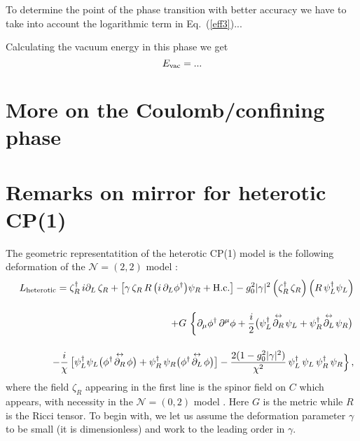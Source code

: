 \documentclass[epsfig,12pt]{article}
\def\beq{\begin{equation}}
\def\eeq{\end{equation}}
\def\beqn{\begin{eqnarray}}
\def\eeqn{\end{eqnarray}}
\def\beqn{\begin{eqnarray}}
\def\eeqn{\end{eqnarray}}
\def\beq{\begin{equation}}
\def\eeq{\end{equation}}
\begin{document}
{To determine the point of the phase transition with better accuracy we have to take into account
the logarithmic term in Eq.~(\ref{eff3})...

Calculating the vacuum energy in this phase we get
\beq
E_{\rm vac}=...
\eeq



\section{More on the Coulomb/confining phase}

\newpage

\section{Remarks on mirror for heterotic CP(1) }



The geometric representatition of  the heterotic CP(1) model is the following deformation
of the ${\mathcal N}=(2,2)$ model \cite{SY1}:
\beqn
&&
L_{{\rm heterotic}}= 
\zeta_R^\dagger \, i\partial_L \, \zeta_R  + 
\left[\gamma \, \zeta_R  \,R\,  \big( i\,\partial_{L}\phi^{\dagger} \big)\psi_R
+{\rm H.c.}\right] -g_0^2|\gamma |^2 \left(\zeta_R^\dagger\, \zeta_R
\right)\left(R\,  \psi_L^\dagger\psi_L\right)
\nonumber
\\[4mm]
&&
+
G\, \left\{\rule{0mm}{5mm}
\partial_\mu \phi^\dagger\, \partial^\mu\phi  
+\frac{i}{2}\big(\psi_L^\dagger\!\stackrel{\leftrightarrow}{\partial_R}\!\psi_L 
+ \psi_R^\dagger\!\stackrel{\leftrightarrow}{\partial_L}\!\psi_R
\big)\right.
\nonumber
\\[4mm] 
&&
-\frac{i}{\chi}\,  \big[\psi_L^\dagger \psi_L
\big(\phi^\dagger \!\stackrel{\leftrightarrow}{\partial_R}\!\phi
\big)+ \psi_R^\dagger\, \psi_R
\big(\phi^\dagger\!\stackrel{\leftrightarrow}{\partial_L}\!\phi
\big)
\big]
-
\frac{2(1- g_0^2 |\gamma |^2)}{\chi^2}\,\psi_L^\dagger\,\psi_L \,\psi_R^\dagger\,\psi_R
\Big\}\,,
\label{AAone}
\eeqn
where the field $\zeta_R$ appearing in the first line is
the spinor field on $C$ which appears, with necessity in the ${\mathcal N}=(0,2)$ model \cite{EdTo}.
Here $G$ is the metric while $R$ is the Ricci tensor.
To begin with, we let us assume the deformation parameter $\gamma$ to be small (it is dimensionless)
and work to the leading order in $\gamma$.

}
\end{document}
